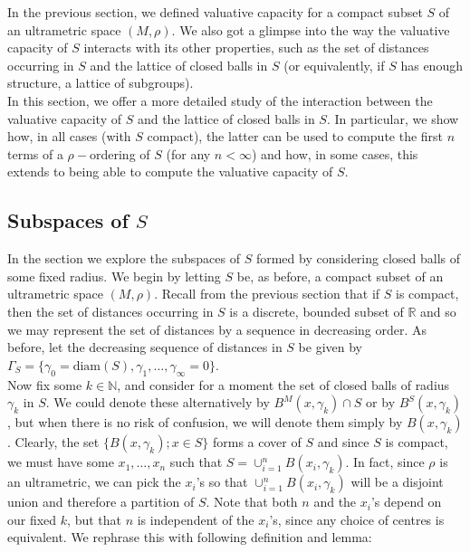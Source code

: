 
In the previous section, we defined valuative capacity for a compact subset $S$ of an ultrametric space $(M, \rho)$. We also got a glimpse into the way the valuative capacity of $S$ interacts with its other properties, such as the set of distances occurring in $S$ and the lattice of closed balls in $S$ (or equivalently, if $S$ has enough structure, a lattice of subgroups).\\

In this section, we offer a more detailed study of the interaction between the valuative capacity of $S$ and the lattice of closed balls in $S$. In particular, we  show how, in all cases (with $S$ compact), the latter can be used to compute the first $n$ terms of a $\rho-$ordering of $S$ (for any $n < \infty$) and how, in some cases, this extends to being able to compute the valuative capacity of $S$.\\

\subsection*{Subspaces of $S$}
In the section we explore the subspaces of $S$ formed by considering closed balls of some fixed radius. We begin by letting $S$ be, as before,  a compact subset of an ultrametric space $(M, \rho)$.  Recall from the previous section that if $S$ is compact, then the set of distances occurring in $S$ is a discrete, bounded subset of $\mathbb{R}$ and so we may represent the set of distances by a sequence in decreasing order. As before, let the decreasing sequence of distances in $S$ be given by  $\Gamma_S =\{\gamma_0=\text{diam}(S), \gamma_1,\ldots,\gamma_\infty=0\}$.\\

 Now fix some $k \in \mathbb{N}$, and consider for a moment the set of closed balls of radius $\gamma_k$ in $S$. We could denote these alternatively by $B^M(x, \gamma_k) \cap S$ or by  $B^S(x, \gamma_k)$, but when there is no risk of confusion, we will denote them simply by $B(x, \gamma_k)$. Clearly, the set  $\{B(x, \gamma_k); x \in S\}$ forms a cover of $S$ and since $S$ is compact, we must have some $x_1,\ldots, x_n$  such that $S= \cup_{i=1}^n B(x_i, \gamma_k)$. In fact,  since $\rho$ is an ultrametric, we can pick the $x_i$'s so that $\cup_{i=1}^n B(x_i, \gamma_k)$ will be a disjoint union and therefore a partition of $S$. Note that both $n$ and the $x_i$'s depend on our fixed $k$, but that $n$ is independent of the $x_i$'s, since any choice of centres is equivalent. We rephrase this with following definition and lemma:

